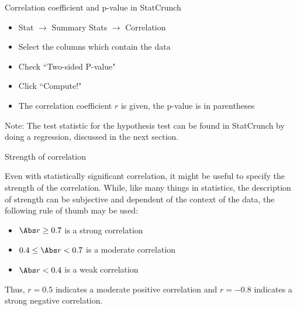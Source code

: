 \documentclass[xcolor=table]{beamer}
\begin{document}
\begin{frame}{Correlation coefficient and p-value in StatCrunch}
\begin{block}{}
\large
\begin{itemize}
\item Stat $\to$ Summary Stats $\to$ Correlation
\item Select the columns which contain the data
\item Check ``Two-sided P-value"
\item Click ``Compute!"
\item The correlation coefficient $r$ is given, the p-value is in parentheses
\end{itemize} 
\end{block}
\begin{block}{}
\large
Note: The test statistic for the hypothesis test can be found in StatCrunch by doing a regression, discussed in the next section. 
\end{block}
\end{frame}

\begin{frame}{Strength of correlation}
\begin{block}{}
\large
Even with statistically significant correlation, it might be useful to specify the strength of the correlation. While, like many things in statistics, the description of strength can be subjective and dependent of the context of the data, the following rule of thumb may be used:
\begin{itemize}
\pause\item $\Abs r \ge 0.7$ is a strong correlation
\pause\item $0.4 \le \Abs r < 0.7$ is a moderate correlation
\pause\item $\Abs r < 0.4$ is a weak correlation
\end{itemize}
\pause Thus, $r=0.5$ indicates a moderate positive correlation and $r=-0.8$ indicates a strong negative correlation.
\end{block}
\end{frame}
\end{document}
